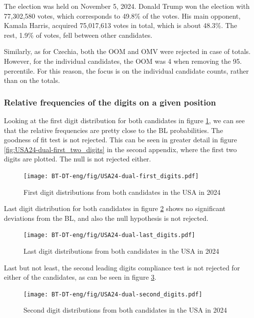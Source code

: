 The election was held on November 5, 2024. Donald Trump won the election with 77,302,580 votes, which corresponds to 49.8\% of the votes. His main opponent, Kamala Harris, acquired 75,017,613 votes in total, which is about 48.3\%. The rest, 1.9\% of votes, fell between other candidates. 
\cite{USA24results}


Similarly, as for Czechia, both the OOM and OMV were rejected in case of totals. However, for the individual candidates, the OOM was 4 when removing the 95. percentile. For this reason, the focus is on the individual candidate counts, rather than on the totals. 

\newpage

\subsubsection{Relative frequencies of the digits on a given position}

Looking at the first digit distribution for both candidates in figure \ref{fig:USA24-dual-first_digits}, we can see that the relative frequencies are pretty close to the BL probabilities. The goodness of fit test is not rejected. This can be seen in greater detail in figure \ref{fig:USA24-dual-first_two_digits} in the second appendix, where the first two digits are plotted. The null is not rejected either. 

\begin{figure}[h]
    \centering
    \caption{First digit distributions from both candidates in the USA in 2024}
    \texttt{[image: BT-DT-eng/fig/USA24-dual-first\_digits.pdf]}
    \label{fig:USA24-dual-first_digits}
\end{figure}

Last digit distribution for both candidates in figure \ref{fig:USA24-dual-last_digits} shows no significant deviations from the BL, and also the null hypothesis is not rejected. 

\begin{figure}[h]
    \centering
    \caption{Last digit distributions from both candidates in the USA in 2024}
    \texttt{[image: BT-DT-eng/fig/USA24-dual-last\_digits.pdf]}
    \label{fig:USA24-dual-last_digits}
\end{figure}

Last but not least, the second leading digits compliance test is not rejected for either of the candidates, as can be seen in figure \ref{fig:USA24-dual-second_digits}. 

\begin{figure}[h]
    \centering
    \caption{Second digit distributions from both candidates in the USA in 2024}
    \texttt{[image: BT-DT-eng/fig/USA24-dual-second\_digits.pdf]}
    \label{fig:USA24-dual-second_digits}
\end{figure}

